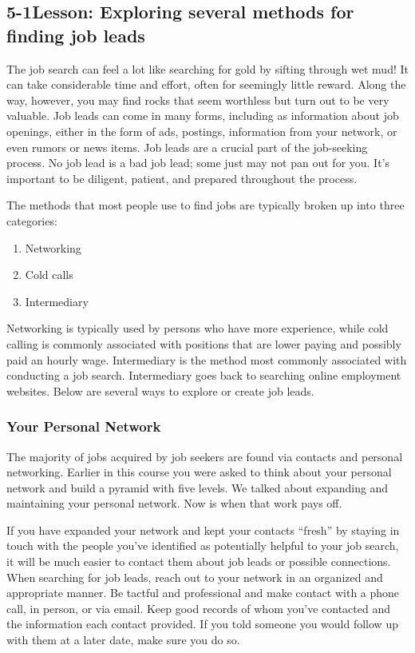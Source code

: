 \pagebreak \subsection*{5-1\quad Lesson: Exploring several methods for finding job leads}
The job search can feel a lot like searching for gold by sifting through wet mud! It can take considerable time and effort, often for seemingly little reward. Along the way, however, you may find rocks that seem worthless but turn out to be very valuable. Job leads can come in many forms, including as information about job openings, either in the form of ads, postings, information from your network, or even rumors or news items. Job leads are a crucial part of the job-seeking process. No job lead is a bad job lead; some just may not pan out for you. It's important to be diligent, patient, and prepared throughout the process.

The methods that most people use to find jobs are typically broken up into three categories:
\begin{enumerate}[leftmargin=0.5cm]
	\item Networking
	\item Cold calls
	\item Intermediary
\end{enumerate}
Networking is typically used by persons who have more experience, while cold calling is commonly associated with positions that are lower paying and possibly paid an hourly wage. Intermediary is the method most commonly associated with conducting a job search. Intermediary goes back to searching online employment websites.
Below are several ways to explore or create job leads.

\subsubsection*{Your Personal Network}
The majority of jobs acquired by job seekers are found via contacts and personal networking. Earlier in this course you were asked to think about your personal network and build a pyramid with five levels. We talked about expanding and maintaining your personal network. Now is when that work pays off.

If you have expanded your network and kept your contacts ``fresh'' by staying in touch with the people you've identified as potentially helpful to your job search, it will be much easier to contact them about job leads or possible connections. When searching for job leads, reach out to your network in an organized and appropriate manner.
Be tactful and professional and make contact with a phone call, in person, or via email.
Keep good records of whom you've contacted and the information each contact provided. If you told someone you would follow up with them at a later date, make sure you do so.

